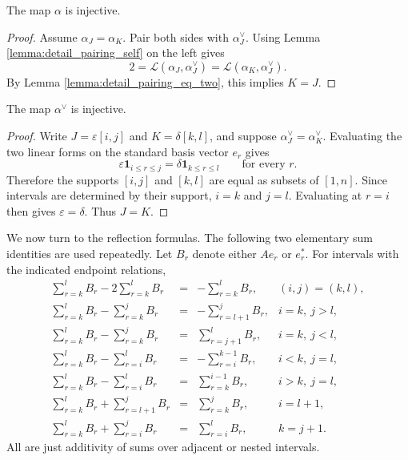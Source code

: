 \begin{lemma}\label{lemma:detail_alpha_injective}
The map $\alpha$ is injective.
\end{lemma}
\begin{proof}
Assume $\alpha_J=\alpha_K$.  Pair both sides with $\alpha_J^\vee$.
Using Lemma \ref{lemma:detail_pairing_self} on the left gives
\[
  2
  =
  \mathcal L(\alpha_J,\alpha_J^\vee)
  =
  \mathcal L(\alpha_K,\alpha_J^\vee).
\]
By Lemma \ref{lemma:detail_pairing_eq_two}, this implies $K=J$.
\end{proof}

\begin{lemma}\label{lemma:detail_alpha_dual_injective}
The map $\alpha^\vee$ is injective.
\end{lemma}
\begin{proof}
Write $J=\varepsilon[i,j]$ and $K=\delta[k,l]$, and suppose
$\alpha_J^\vee=\alpha_K^\vee$.  Evaluating the two linear forms on the
standard basis vector $e_r$ gives
\[
  \varepsilon\mathbf{1}_{i\le r\le j}
  =
  \delta\mathbf{1}_{k\le r\le l}
  \qquad\text{for every }r.
\]
Therefore the supports $[i,j]$ and $[k,l]$ are equal as subsets of
$[1,n]$.  Since intervals are determined by their support, $i=k$ and
$j=l$.  Evaluating at $r=i$ then gives $\varepsilon=\delta$.  Thus
$J=K$.
\end{proof}

We now turn to the reflection formulas.  The following two elementary
sum identities are used repeatedly.  Let $B_r$ denote either $A e_r$ or
$e_r^\ast$.  For intervals with the indicated endpoint relations,
\[
\begin{array}{rcll}
  \sum_{r=k}^{l}B_r-2\sum_{r=k}^{l}B_r
    &=&-\sum_{r=k}^{l}B_r,
      &(i,j)=(k,l),\\
  \sum_{r=k}^{l}B_r-\sum_{r=k}^{j}B_r
    &=&-\sum_{r=l+1}^{j}B_r,
      &i=k,\ j>l,\\
  \sum_{r=k}^{l}B_r-\sum_{r=k}^{j}B_r
    &=&\sum_{r=j+1}^{l}B_r,
      &i=k,\ j<l,\\
  \sum_{r=k}^{l}B_r-\sum_{r=i}^{l}B_r
    &=&-\sum_{r=i}^{k-1}B_r,
      &i<k,\ j=l,\\
  \sum_{r=k}^{l}B_r-\sum_{r=i}^{l}B_r
    &=&\sum_{r=k}^{i-1}B_r,
      &i>k,\ j=l,\\
  \sum_{r=k}^{l}B_r+\sum_{r=l+1}^{j}B_r
    &=&\sum_{r=k}^{j}B_r,
      &i=l+1,\\
  \sum_{r=k}^{l}B_r+\sum_{r=i}^{j}B_r
    &=&\sum_{r=i}^{l}B_r,
      &k=j+1.
\end{array}
\]
All are just additivity of sums over adjacent or nested intervals.

